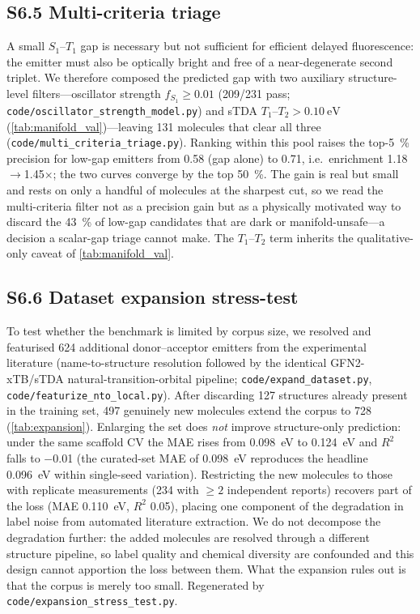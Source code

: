 \documentclass[final,3p,times,twocolumn]{elsarticle}
\begin{document}
\subsection*{S6.5 Multi-criteria triage}
A small $S_1$--$T_1$ gap is necessary but not sufficient for efficient delayed
fluorescence: the emitter must also be optically bright and free of a near-degenerate
second triplet. We therefore composed the predicted gap with two auxiliary structure-level
filters---oscillator strength $f_{S_1}\ge\num{0.01}$ (\num{209}/\num{231} pass;
\texttt{code/oscillator\_strength\_model.py}) and sTDA $T_1$--$T_2 > \qty{0.10}{\electronvolt}$
(\cref{tab:manifold_val})---leaving \num{131} molecules that clear all three
(\texttt{code/multi\_criteria\_triage.py}). Ranking within this pool raises the top-\qty{5}{\percent}
precision for low-gap emitters from \num{0.58} (gap alone) to \num{0.71}, i.e.\ enrichment
\num{1.18}$\rightarrow$\num{1.45}$\times$; the two curves converge by the top \qty{50}{\percent}.
The gain is real but small and rests on only a handful of molecules at the sharpest cut, so we
read the multi-criteria filter not as a precision gain but as a physically motivated way
to discard the \qty{43}{\percent} of low-gap candidates that are dark or manifold-unsafe---a
decision a scalar-gap triage cannot make. The $T_1$--$T_2$ term inherits the qualitative-only
caveat of \cref{tab:manifold_val}.

\subsection*{S6.6 Dataset expansion stress-test}
To test whether the benchmark is limited by corpus size, we resolved and featurised
\num{624} additional donor--acceptor emitters from the experimental literature
(name-to-structure resolution followed by the identical GFN2-xTB/sTDA natural-transition-orbital
pipeline; \texttt{code/expand\_dataset.py}, \texttt{code/featurize\_nto\_local.py}). After
discarding \num{127} structures already present in the training set, \num{497} genuinely new
molecules extend the corpus to \num{728} (\cref{tab:expansion}). Enlarging the set does
\emph{not} improve structure-only prediction: under the same scaffold CV the MAE rises from
\qty{0.098}{\electronvolt} to \qty{0.124}{\electronvolt} and $R^2$ falls to \num{-0.01} (the
curated-set MAE of \qty{0.098}{\electronvolt} reproduces the headline \qty{0.096}{\electronvolt}
within single-seed variation). Restricting the new molecules to those with replicate
measurements (\num{234} with $\ge\num{2}$ independent reports) recovers part of the loss
(MAE \qty{0.110}{\electronvolt}, $R^2$ \num{0.05}), placing one component of the degradation in
label noise from automated literature extraction. We do not decompose the degradation
further: the added molecules are resolved through a different structure pipeline, so
label quality and chemical diversity are confounded and this design cannot apportion the
loss between them. What the expansion rules out is that the corpus is merely too small. Regenerated by \texttt{code/expansion\_stress\_test.py}.
\end{document}
